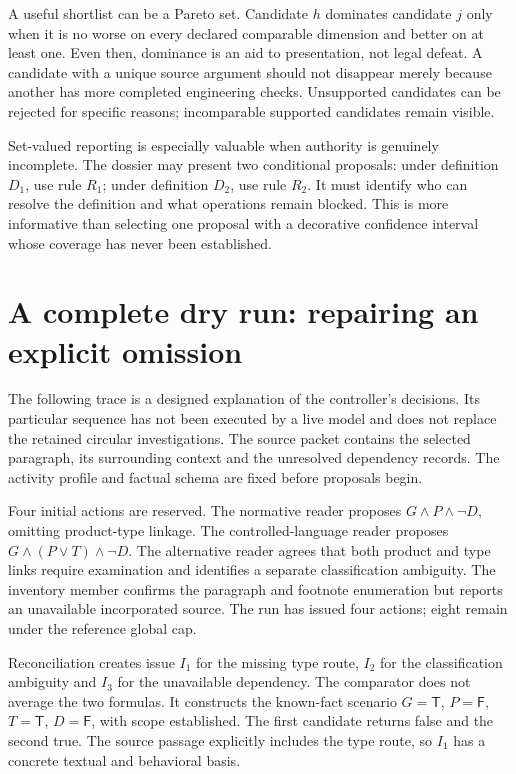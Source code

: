 \documentclass[12pt,a4paper,oneside,openany]{book}
\newcommand{\True}{\mathsf{T}}
\newcommand{\False}{\mathsf{F}}
\begin{document}
A useful shortlist can be a Pareto set. Candidate $h$ dominates candidate $j$ only
when it is no worse on every declared comparable dimension and better on at least
one. Even then, dominance is an aid to presentation, not legal defeat. A candidate
with a unique source argument should not disappear merely because another has
more completed engineering checks. Unsupported candidates can be rejected for
specific reasons; incomparable supported candidates remain visible.

Set-valued reporting is especially valuable when authority is genuinely
incomplete. The dossier may present two conditional proposals: under definition
$D_1$, use rule $R_1$; under definition $D_2$, use rule $R_2$. It must identify who
can resolve the definition and what operations remain blocked. This is more
informative than selecting one proposal with a decorative confidence interval
whose coverage has never been established.

\section{A complete dry run: repairing an explicit omission}
\label{merge:M06:20}


The following trace is a designed explanation of the controller's decisions.
Its particular sequence has not been executed by a live model and does not
replace the retained circular investigations. The source packet contains the selected paragraph, its surrounding
context and the unresolved dependency records. The activity profile and factual
schema are fixed before proposals begin.

Four initial actions are reserved. The normative reader proposes
$G\land P\land\neg D$, omitting product-type linkage. The controlled-language
reader proposes $G\land(P\lor T)\land\neg D$. The alternative reader agrees that
both product and type links require examination and identifies a separate
classification ambiguity. The inventory member confirms the paragraph and
footnote enumeration but reports an unavailable incorporated source. The run has
issued four actions; eight remain under the reference global cap.

Reconciliation creates issue $I_1$ for the missing type route, $I_2$ for the
classification ambiguity and $I_3$ for the unavailable dependency. The comparator
does not average the two formulas. It constructs the known-fact scenario
$G=\True$, $P=\False$, $T=\True$, $D=\False$, with scope established. The first
candidate returns false and the second true. The source passage explicitly
includes the type route, so $I_1$ has a concrete textual and behavioral basis.
\end{document}
